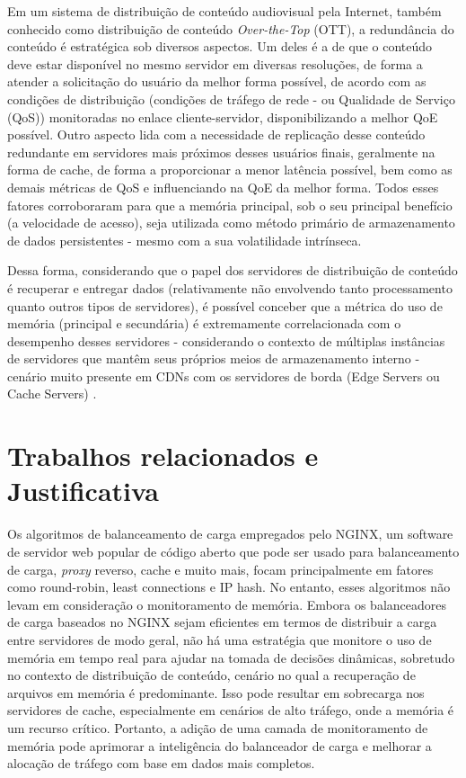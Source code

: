 \documentclass[11pt]{article}
\begin{document}
Em um sistema de distribuição de conteúdo audiovisual pela Internet, também conhecido como distribuição de conteúdo \textit{Over-the-Top} (OTT), a redundância do conteúdo é estratégica sob diversos aspectos. Um deles é a de que o conteúdo deve estar disponível no mesmo servidor em diversas resoluções, de forma a atender a solicitação do usuário da melhor forma possível, de acordo com as condições de distribuição (condições de tráfego de rede - ou Qualidade de Serviço (QoS)) monitoradas no enlace cliente-servidor, disponibilizando a melhor QoE possível. Outro aspecto lida com a necessidade de replicação desse conteúdo redundante em servidores mais próximos desses usuários finais, geralmente na forma de cache, de forma a proporcionar a menor latência possível, bem como as demais métricas de QoS e influenciando na QoE da melhor forma.
%
Todos esses fatores corroboraram para que a memória principal, sob o seu principal benefício (a velocidade de acesso), seja utilizada como método primário de armazenamento de dados persistentes - mesmo com a sua volatilidade intrínseca.

Dessa forma, considerando que o papel dos servidores de distribuição de conteúdo é recuperar e entregar dados (relativamente não envolvendo tanto processamento quanto outros tipos de servidores), é possível conceber que a métrica do uso de memória (principal e secundária) é extremamente correlacionada com o desempenho desses servidores - considerando o contexto de múltiplas instâncias de servidores que mantêm seus próprios meios de armazenamento interno - cenário muito presente em CDNs com os servidores de borda (Edge Servers ou Cache Servers) \cite{surveyCDNArchitectures2025}.
	
\section{Trabalhos relacionados e Justificativa} \label{sec:trabalhos-relacionados}

Os algoritmos de balanceamento de carga empregados pelo NGINX, um software de servidor web popular de código aberto que pode ser usado para balanceamento de carga, \textit{proxy} reverso, cache e muito mais, \cite{nginxDoc} focam principalmente em fatores como round-robin, least connections e IP hash. No entanto, esses algoritmos não levam em consideração o monitoramento de memória. Embora os balanceadores de carga baseados no NGINX sejam eficientes em termos de distribuir a carga entre servidores de modo geral, não há uma estratégia que monitore o uso de memória em tempo real para ajudar na tomada de decisões dinâmicas, sobretudo no contexto de distribuição de conteúdo, cenário no qual a recuperação de arquivos em memória é predominante. Isso pode resultar em sobrecarga nos servidores de cache, especialmente em cenários de alto tráfego, onde a memória é um recurso crítico. Portanto, a adição de uma camada de monitoramento de memória pode aprimorar a inteligência do balanceador de carga e melhorar a alocação de tráfego com base em dados mais completos.
\end{document}
